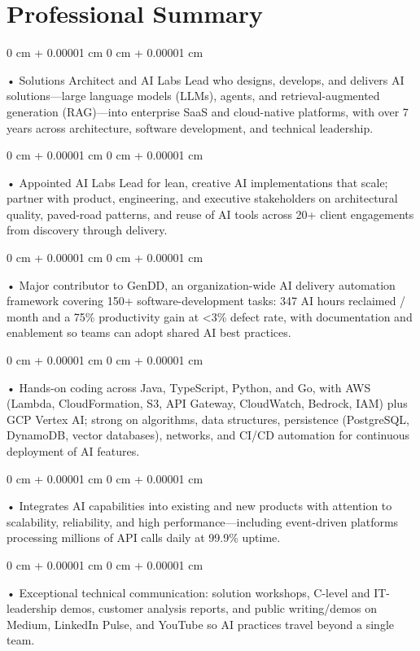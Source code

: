 \documentclass[10pt, letterpaper]{article}
\newenvironment{onecolentry}{
    \begin{adjustwidth}{
        0 cm + 0.00001 cm
    }{
        0 cm + 0.00001 cm
    }
}{
    \end{adjustwidth}
} %
\begin{document}
    \section{Professional Summary}
        \vspace{2 pt }
        \begin{onecolentry}
            • Solutions Architect and AI Labs Lead who designs, develops, and delivers AI solutions---large language models (LLMs), agents, and retrieval-augmented generation (RAG)---into enterprise SaaS and cloud-native platforms, with over 7 years across architecture, software development, and technical leadership.
        \end{onecolentry}
        \begin{onecolentry}
            • Appointed AI Labs Lead for lean, creative AI implementations that scale; partner with product, engineering, and executive stakeholders on architectural quality, paved-road patterns, and reuse of AI tools across 20+ client engagements from discovery through delivery.
        \end{onecolentry}
        \begin{onecolentry}
            • Major contributor to GenDD, an organization-wide AI delivery automation framework covering 150+ software-development tasks: 347 AI hours reclaimed / month and a 75\% productivity gain at {<}3\% defect rate, with documentation and enablement so teams can adopt shared AI best practices.
        \end{onecolentry}
        \begin{onecolentry}
            • Hands-on coding across Java, TypeScript, Python, and Go, with AWS (Lambda, CloudFormation, S3, API Gateway, CloudWatch, Bedrock, IAM) plus GCP Vertex AI; strong on algorithms, data structures, persistence (PostgreSQL, DynamoDB, vector databases), networks, and CI/CD automation for continuous deployment of AI features.
        \end{onecolentry}
        \begin{onecolentry}
            • Integrates AI capabilities into existing and new products with attention to scalability, reliability, and high performance---including event-driven platforms processing millions of API calls daily at 99.9\% uptime.
        \end{onecolentry}
        \begin{onecolentry}
            • Exceptional technical communication: solution workshops, C-level and IT-leadership demos, customer analysis reports, and public writing/demos on Medium, LinkedIn Pulse, and YouTube so AI practices travel beyond a single team.
        \end{onecolentry}
\end{document}
